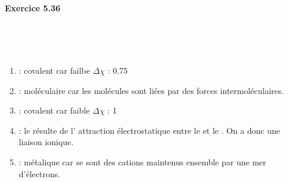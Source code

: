 \documentclass{article}
\newcommand\exercice[1]{%
\paragraph{#1}%
~\par
~\par}
\begin{document}
\exercice{Exercice 5.36}

\begin{enumerate}\renewcommand{\theenumi}{\alph{enumi}}
	\item	{} : covalent car failbe $\Delta \chi$ : 0.75
	\item	{} : moléculaire car les molécules sont liées par des forces intermoléculaires.
	\item	{} : covalent car faible $\Delta \chi$ : 1
	\item	{} : le  résulte de l'
				attraction électrostatique entre le 
				et le . On a donc une liaison ionique.
	\item	{} : métalique car se sont des cations maintenus ensemble par une mer d'électrons.
\end{enumerate}	
				
\end{document}
